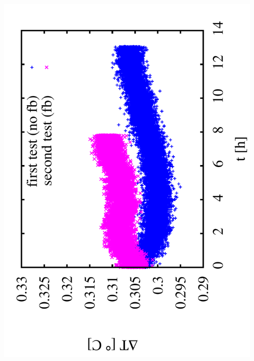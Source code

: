 \documentclass[a4paper,11pt]{book}
\begin{document}
 \hspace*{2.5cm}\includegraphics[angle=-90,scale=0.18]{image_ai_31.pdf}\\
\end{document}

